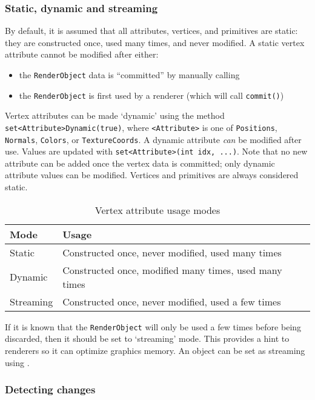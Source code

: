 \documentclass{article}
\newenvironment{tightemize}{\begin{itemize}[nolistsep,noitemsep]}{\end{itemize}}
\begin{document}
\subsubsection{Static, dynamic and streaming}

By default, it is assumed that all attributes, vertices, and primitives are static: they
are constructed once, used many times, and never modified.  A static vertex attribute
cannot be modified after either:
\begin{tightemize}
   \item the \lstinline{RenderObject} data is ``committed'' by manually calling 
   \item the \lstinline{RenderObject} is first used by a renderer (which will call \lstinline{commit()})
\end{tightemize}
Vertex attributes can be made `dynamic' using the method \lstinline{set<Attribute>Dynamic(true)}, 
where \lstinline{<Attribute>} is one of \lstinline{Positions}, \lstinline{Normals}, 
\lstinline{Colors}, or \lstinline{TextureCoords}.  A dynamic attribute \emph{can} be 
modified after use.  Values are updated with \lstinline{set<Attribute>(int idx, ...)}.
Note that no new attribute can be added once the vertex data is committed; only dynamic
attribute values can be modified.  Vertices and primitives are always considered 
static.  
\begin{table}
\centering
\caption{Vertex attribute usage modes}
\begin{tabular}{ll}
\hline\hline
Mode & Usage\\
\hline
Static & Constructed once, never modified, used many times\\
Dynamic & Constructed once, modified many times, used many times\\
Streaming & Constructed once, never modified, used a few times\\
\hline
\end{tabular}
\end{table}

If it is known that the \lstinline{RenderObject} will only be used a few times before being discarded,
then it should be set to `streaming' mode.  This provides a hint to renderers so it can optimize
graphics memory.  An object can be set as streaming using .

\subsubsection{Detecting changes}
\end{document}
